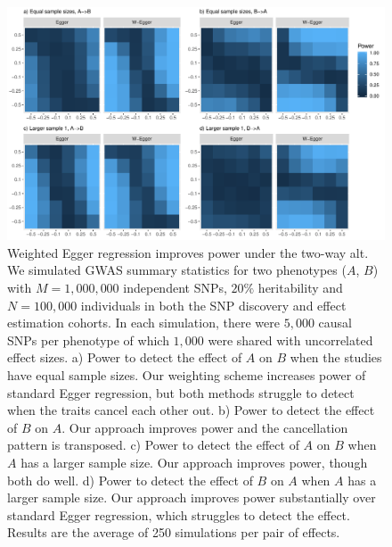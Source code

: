 \documentclass{article}
\begin{document}
\newpage
\begin{figure}[H]\label{figureS0}
\includegraphics[width=\textwidth]{figures/figure_S0.pdf}
\caption{Weighted Egger regression improves power under the two-way alt.
 We simulated GWAS summary statistics for two phenotypes ($A$, $B$) with $M=1,000,000$
independent SNPs, $20\%$ heritability and $N = 100,000$ individuals in both
 the SNP discovery and effect estimation cohorts. In each simulation, there
 were $5,000$ causal SNPs per phenotype of which $1,000$ were shared with uncorrelated
 effect sizes. a) Power to detect the effect of $A$ on $B$ when the studies have equal
 sample sizes. Our weighting scheme increases power of standard Egger regression, but both
 methods struggle to detect when the traits cancel each other out. b) Power to detect the
 effect of $B$ on $A$. Our approach improves power and the cancellation pattern is transposed.
 c) Power to detect the effect of $A$ on $B$ when $A$ has a larger sample size. Our approach
 improves power, though both do well. d) Power to detect the effect of $B$ on $A$ when
  $A$ has a larger sample size. Our approach improves power substantially over standard
  Egger regression, which struggles to detect the effect. Results are the average of 250
  simulations per pair of effects.}
\end{figure}
\end{document}
